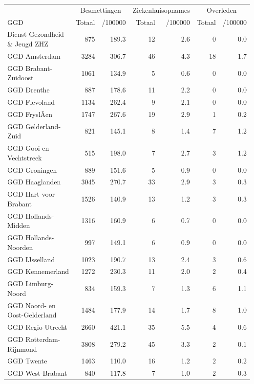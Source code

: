 \documentclass[
  english,
  man,floatsintext]{apa6}
\begin{document}
\begin{table}
\centering\begingroup\fontsize{10}{12}\selectfont

\begin{threeparttable}
\begin{tabular}{lrrrrrr}
\toprule
\multicolumn{1}{c}{ } & \multicolumn{2}{c}{Besmettingen} & \multicolumn{2}{c}{Ziekenhuisopnames} & \multicolumn{2}{c}{Overleden} \\
\cmidrule(l{3pt}r{3pt}){2-3} \cmidrule(l{3pt}r{3pt}){4-5} \cmidrule(l{3pt}r{3pt}){6-7}
GGD & Totaal & /100000 & Totaal & /100000 & Totaal & /100000\\
\midrule
Dienst Gezondheid \& Jeugd ZHZ & 875 & 189.3 & 12 & 2.6 & 0 & 0.0\\
GGD Amsterdam & 3284 & 306.7 & 46 & 4.3 & 18 & 1.7\\
GGD Brabant-Zuidoost & 1061 & 134.9 & 5 & 0.6 & 0 & 0.0\\
GGD Drenthe & 887 & 178.6 & 11 & 2.2 & 0 & 0.0\\
GGD Flevoland & 1134 & 262.4 & 9 & 2.1 & 0 & 0.0\\
GGD FryslÃ¢n & 1747 & 267.6 & 19 & 2.9 & 1 & 0.2\\
GGD Gelderland-Zuid & 821 & 145.1 & 8 & 1.4 & 7 & 1.2\\
GGD Gooi en Vechtstreek & 515 & 198.0 & 7 & 2.7 & 3 & 1.2\\
GGD Groningen & 889 & 151.6 & 5 & 0.9 & 0 & 0.0\\
GGD Haaglanden & 3045 & 270.7 & 33 & 2.9 & 3 & 0.3\\
GGD Hart voor Brabant & 1526 & 140.9 & 13 & 1.2 & 3 & 0.3\\
GGD Hollands-Midden & 1316 & 160.9 & 6 & 0.7 & 0 & 0.0\\
GGD Hollands-Noorden & 997 & 149.1 & 6 & 0.9 & 0 & 0.0\\
GGD IJsselland & 1023 & 190.7 & 13 & 2.4 & 3 & 0.6\\
GGD Kennemerland & 1272 & 230.3 & 11 & 2.0 & 2 & 0.4\\
GGD Limburg-Noord & 834 & 159.3 & 7 & 1.3 & 6 & 1.1\\
GGD Noord- en Oost-Gelderland & 1484 & 177.9 & 14 & 1.7 & 8 & 1.0\\
GGD Regio Utrecht & 2660 & 421.1 & 35 & 5.5 & 4 & 0.6\\
GGD Rotterdam-Rijnmond & 3808 & 279.2 & 45 & 3.3 & 2 & 0.1\\
GGD Twente & 1463 & 110.0 & 16 & 1.2 & 2 & 0.2\\
GGD West-Brabant & 840 & 117.8 & 7 & 1.0 & 2 & 0.3\\

\end{tabular}
\end{threeparttable}
\end{table}
\end{document}
